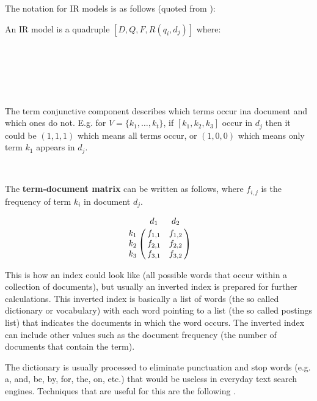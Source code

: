 The notation for IR models is as follows (quoted from \citep[p.58]{Baeza-Yates2011}):

An IR model is a quadruple $[D,Q,F,R(q_{i}, d_{j})]$ where:\\
 \\
 \\
 \\
\\
 \\

The term conjunctive component describes which terms occur ina  document and which ones do not. E.g. for $V =\{k_{1},\ldots, k_{t}\}$, if $[ k_{1},k_{2},k_{3}]$ occur in $d_{j}$ then it could be $(1,1,1)$ which means all terms occur, or $(1,0,0)$ which means only term $k_{1}$ appears in $d_{j}$.

 \\
 

The \textbf{term-document matrix} can be written as follows, where $f_{i,j}$ is the frequency of term $k_{i}$ in document $d_{j}$.

\begin{equation}
  \bbordermatrix{~ & d_1 & d_2 \cr
                k_1 & f_{1,1} & f_{1,2} \cr
                k_2 & f_{2,1} & f_{2,2} \cr
                k_3 & f_{3,1} & f_{3,2} \cr}
\label{eq:tdm}
\end{equation}

This is how an index could look like (all possible words that occur within a collection of documents), but usually an inverted index is prepared for further calculations. This inverted index is basically a list of words (the so called dictionary or vocabulary) with each word pointing to a list (the so called postings list) that indicates the documents in which the word occurs. The inverted index can include other values such as the document frequency (the number of documents that contain the term).

The dictionary is usually processed to eliminate punctuation and stop words (e.g. a, and, be, by, for, the, on, etc.) that would be useless in everyday text search engines. Techniques that are useful for this are the following \citep[Ch.2]{Manning2009}.

